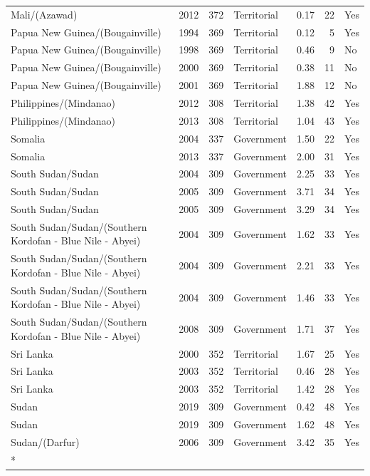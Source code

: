 \begin{longtable}[t]{lrrlrrl}
Mali/(Azawad) & 2012 & 372 & Territorial & 0.17 & 22 & Yes\\
Papua New Guinea/(Bougainville) & 1994 & 369 & Territorial & 0.12 & 5 & Yes\\
Papua New Guinea/(Bougainville) & 1998 & 369 & Territorial & 0.46 & 9 & No\\
\addlinespace
Papua New Guinea/(Bougainville) & 2000 & 369 & Territorial & 0.38 & 11 & No\\
Papua New Guinea/(Bougainville) & 2001 & 369 & Territorial & 1.88 & 12 & No\\
Philippines/(Mindanao) & 2012 & 308 & Territorial & 1.38 & 42 & Yes\\
Philippines/(Mindanao) & 2013 & 308 & Territorial & 1.04 & 43 & Yes\\
Somalia & 2004 & 337 & Government & 1.50 & 22 & Yes\\
\addlinespace
Somalia & 2013 & 337 & Government & 2.00 & 31 & Yes\\
South Sudan/Sudan & 2004 & 309 & Government & 2.25 & 33 & Yes\\
South Sudan/Sudan & 2005 & 309 & Government & 3.71 & 34 & Yes\\
South Sudan/Sudan & 2005 & 309 & Government & 3.29 & 34 & Yes\\
South Sudan/Sudan/(Southern Kordofan - Blue Nile - Abyei) & 2004 & 309 & Government & 1.62 & 33 & Yes\\
\addlinespace
South Sudan/Sudan/(Southern Kordofan - Blue Nile - Abyei) & 2004 & 309 & Government & 2.21 & 33 & Yes\\
South Sudan/Sudan/(Southern Kordofan - Blue Nile - Abyei) & 2004 & 309 & Government & 1.46 & 33 & Yes\\
South Sudan/Sudan/(Southern Kordofan - Blue Nile - Abyei) & 2008 & 309 & Government & 1.71 & 37 & Yes\\
Sri Lanka & 2000 & 352 & Territorial & 1.67 & 25 & Yes\\
Sri Lanka & 2003 & 352 & Territorial & 0.46 & 28 & Yes\\
\addlinespace
Sri Lanka & 2003 & 352 & Territorial & 1.42 & 28 & Yes\\
Sudan & 2019 & 309 & Government & 0.42 & 48 & Yes\\
Sudan & 2019 & 309 & Government & 1.62 & 48 & Yes\\
Sudan/(Darfur) & 2006 & 309 & Government & 3.42 & 35 & Yes\\*
\end{longtable}
\endgroup{}
